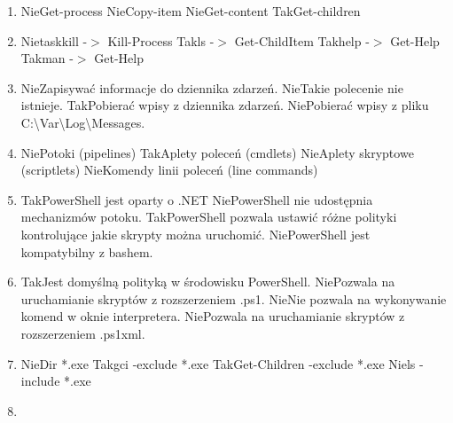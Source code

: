 \begin{enumerate}
		{Tak}{poszczególne polecenia należą do tzw. poleceń Cmdlet. (należy do poleceń Cmdlet - inna odpowiedź) }%
		{Nie}{zatrzymuje wszystkie uruchomione procesy.}%
		{Nie}{zatrzymuje wszystkie procesy działające na partycji D.}%
		{Tak}{zatrzymuje wszystkie procesy których nazwa rozpoczyna się literą "d".}
		\item {}%
		{Nie}{Get-process}%
		{Nie}{Copy-item}%
		{Nie}{Get-content}%
		{Tak}{Get-children}
		\item {}%
		{Nie}{taskkill -$>$ Kill-Process}%
		{Tak}{ls -$>$ Get-ChildItem}%
		{Tak}{help -$>$ Get-Help}%
		{Tak}{man -$>$ Get-Help}
		\item {}%
		{Nie}{Zapisywać informacje do dziennika zdarzeń.}%
		{Nie}{Takie polecenie nie istnieje.}%
		{Tak}{Pobierać wpisy z dziennika zdarzeń.}%
		{Nie}{Pobierać wpisy z pliku C:\textbackslash Var\textbackslash Log\textbackslash Messages.}
		\item {}%
		{Nie}{Potoki (pipelines)}%
		{Tak}{Aplety poleceń (cmdlets)}%
		{Nie}{Aplety skryptowe (scriptlets)}%
		{Nie}{Komendy linii poleceń (line commands)}
		\item {}%
		{Tak}{PowerShell jest oparty o .NET}%
		{Nie}{PowerShell nie udostępnia mechanizmów potoku.}%
		{Tak}{PowerShell pozwala ustawić różne polityki kontrolujące jakie skrypty można uruchomić.}%
		{Nie}{PowerShell jest kompatybilny z bashem.}
		\newpage
		\item {}%
		{Tak}{Jest domyślną polityką w środowisku PowerShell.}%
		{Nie}{Pozwala na uruchamianie skryptów z rozszerzeniem .ps1.}%
		{Nie}{Nie pozwala na wykonywanie komend w oknie interpretera.}%
		{Nie}{Pozwala na uruchamianie skryptów z rozszerzeniem .ps1xml.}
		\item {}%
		{Nie}{Dir *.exe}%
		{Tak}{gci -exclude *.exe}%
		{Tak}{Get-Children -exclude *.exe}%
		{Nie}{ls -include *.exe}
		\item {}%

\end{enumerate}
